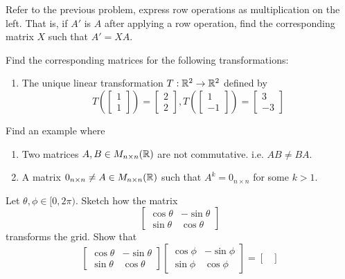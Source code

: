 \begin{exerciselist}
		\item Refer to the previous problem, express row operations as multiplication on the left. That is, if $A'$ is $A$ after applying a row operation, find the corresponding matrix $X$ such that $A'=XA$.
	\item Find the corresponding matrices for the following transformations: \begin{enumerate}[label=(\alph*)]
		\item The unique linear transformation $T:\mathbb{R}^2 \to \mathbb{R}^2$ defined by \[
		T\left(\begin{bmatrix}
			1\\1
		\end{bmatrix}\right)=\begin{bmatrix}
			2\\2
		\end{bmatrix}, T\left(\begin{bmatrix}
			1\\-1
		\end{bmatrix}\right)=\begin{bmatrix}
			3\\-3
		\end{bmatrix}
		\]
	\end{enumerate}
	\item Find an example where \begin{enumerate}[label=(\alph*)]
		\item Two matrices $A,B\in M_{n\times n}(\mathbb{R})$ are not commutative. i.e. $AB\neq BA$.
		\item A matrix $0_{n\times n}\neq A\in M_{n\times n }(\mathbb{R})$ such that $A^k=0_{n\times n}$ for some $k>1$.
	\end{enumerate}
	\item Let $\theta,\phi\in[0,2\pi)$. Sketch how the matrix \[\begin{bmatrix}
		\cos \theta & -\sin \theta\\
		\sin \theta & \cos \theta
	\end{bmatrix}
	\] transforms the grid. Show that \[
		\begin{bmatrix}
			\cos \theta & -\sin \theta\\
			\sin \theta & \cos \theta
		\end{bmatrix}
		\begin{bmatrix}
			\cos \phi & -\sin \phi\\
			\sin \phi & \cos \phi
		\end{bmatrix}
		=
		\begin{bmatrix}

\end{bmatrix}\]
\end{exerciselist}

